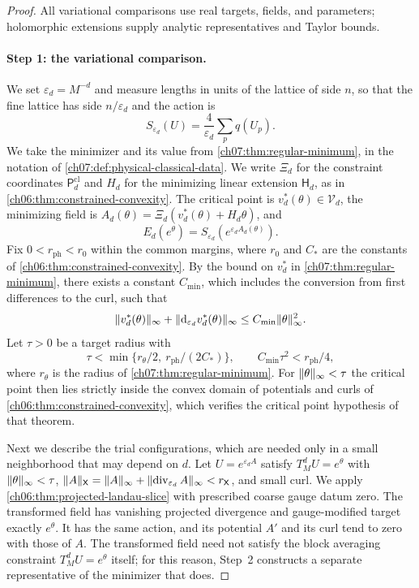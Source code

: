 \begin{proof}
All variational comparisons use real targets, fields, and parameters; holomorphic extensions supply analytic representatives and Taylor bounds.

\paragraph{Step 1: the variational comparison.}
We set $\varepsilon_d=M^{-d}$ and measure lengths in units of the lattice of side $n$, so that the fine lattice has side $n/\varepsilon_d$ and the action is
\begin{equation}\label{ch32:eq:physical-action}
 S_{\varepsilon_d}(U)=\frac4{\varepsilon_d}\sum_pq(U_p).
\end{equation}
We take the minimizer and its value from \cref{ch07:thm:regular-minimum}, in the notation of \cref{ch07:def:physical-classical-data}. We write $\Xi_d$ for the constraint coordinates $\mathsf P_d^{\mathrm{cl}}$ and $H_d$ for the minimizing linear extension $\mathsf H_d$, as in \cref{ch06:thm:constrained-convexity}. The critical point is $v_d^*(\theta)\in\mathcal V_d$, the minimizing field is $A_d(\theta)=\Xi_d(v_d^*(\theta)+H_d\theta)$, and
\begin{equation}\label{ch32:eq:attained-value}
 E_d(e^\theta)=S_{\varepsilon_d}(e^{\varepsilon_dA_d(\theta)}).
\end{equation}
Fix $0<r_{\mathrm{ph}}<r_0$ within the common margins, where $r_0$ and $C_*$ are the constants of \cref{ch06:thm:constrained-convexity}. By the bound on $v_d^*$ in \cref{ch07:thm:regular-minimum}, there exists a constant $C_{\min}$, which includes the conversion from first differences to the curl, such that
\[
 \lVert v_d^*(\theta)\rVert_\infty+\lVert \mathrm d_{\varepsilon_d}v_d^*(\theta)\rVert_\infty\le C_{\min}\lVert \theta\rVert_\infty^2.
\]
Let $\tau>0$ be a target radius with
\begin{equation}\label{ch32:eq:minimum-domain}
 \tau<\min\{r_\theta/2,\ r_{\mathrm{ph}}/(2C_*)\},\qquad C_{\min}\tau^2<r_{\mathrm{ph}}/4,
\end{equation}
where $r_\theta$ is the radius of \cref{ch07:thm:regular-minimum}. For $\lVert \theta\rVert_\infty<\tau$ the critical point then lies strictly inside the convex domain of potentials and curls of \cref{ch06:thm:constrained-convexity}, which verifies the critical point hypothesis of that theorem.

Next we describe the trial configurations, which are needed only in a small neighborhood that may depend on $d$. Let $U=e^{\varepsilon_dA}$ satisfy $T_M^dU=e^\theta$ with $\lVert \theta\rVert_\infty<\tau$, $\lVert A\rVert_{\mathsf X}=\lVert A\rVert_\infty+\lVert \operatorname{div}_{\varepsilon_d}A\rVert_\infty<r_{\mathsf X}$, and small curl. We apply \cref{ch06:thm:projected-landau-slice} with prescribed coarse gauge datum zero. The transformed field has vanishing projected divergence and gauge-modified target exactly $e^\theta$. It has the same action, and its potential $A'$ and its curl tend to zero with those of $A$. The transformed field need not satisfy the block averaging constraint $T_M^dU=e^\theta$ itself; for this reason, Step~2 constructs a separate representative of the minimizer that does.


\end{proof}
